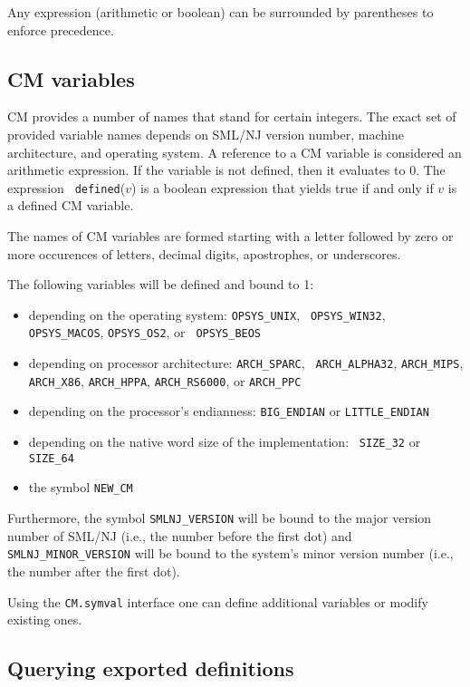 \documentclass{article}
\begin{document}
Any expression (arithmetic or boolean) can be surrounded by
parentheses to enforce precedence.

\subsection{CM variables}
\label{sec:cmvars}

CM provides a number of names that stand for certain integers.  The
exact set of provided variable names depends on SML/NJ version number,
machine architecture, and operating system.  A reference to a CM
variable is considered an arithmetic expression. If the variable is
not defined, then it evaluates to 0.  The expression {\tt
defined}($v$) is a boolean expression that yields true if and only if
$v$ is a defined CM variable.

The names of CM variables are formed starting with a letter followed
by zero or more occurences of letters, decimal digits, apostrophes, or
underscores.

The following variables will be defined and bound to 1:
\begin{itemize}
\item depending on the operating system: {\tt OPSYS\_UNIX}, {\tt
OPSYS\_WIN32}, {\tt OPSYS\_MACOS}, {\tt OPSYS\_OS2}, or {\tt
OPSYS\_BEOS}
\item depending on processor architecture: {\tt ARCH\_SPARC}, {\tt
ARCH\_ALPHA32}, {\tt ARCH\_MIPS}, {\tt ARCH\_X86}, {\tt ARCH\_HPPA},
{\tt ARCH\_RS6000}, or {\tt ARCH\_PPC}
\item depending on the processor's endianness: {\tt BIG\_ENDIAN} or
{\tt LITTLE\_ENDIAN}
\item depending on the native word size of the implementation: {\tt
SIZE\_32} or {\tt SIZE\_64}
\item the symbol {\tt NEW\_CM}
\end{itemize}

Furthermore, the symbol {\tt SMLNJ\_VERSION} will be bound to the
major version number of SML/NJ (i.e., the number before the first dot)
and {\tt SMLNJ\_MINOR\_VERSION} will be bound to the system's minor
version number (i.e., the number after the first dot).

Using the {\tt CM.symval} interface one can define additional
variables or modify existing ones.

\subsection{Querying exported definitions}
\end{document}
